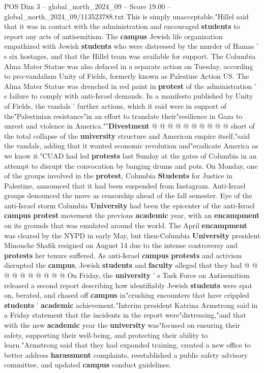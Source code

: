 \begin{textsample}{POS Dim 3 – global\_north\_2024\_09 – Score 19.00 – global\_north\_2024\_09/113523788.txt}
This is simply unacceptable."Hillel said that it was in contact with the administration and encouraged \textbf{students} to report any acts of antisemitism.
The \textbf{campus} Jewish life organization empathized with Jewish \textbf{students} who were distressed by the murder of Hamas ' s six hostages, and that the Hillel team was available for support.
The Columbia Alma Mater Statue was also defaced in a separate action on Tuesday, according to pro-vandalism Unity of Fields, formerly known as Palestine Action US.
The Alma Mater Statue was drenched in red paint in \textbf{protest} of the administration ' s failure to comply with anti-Israel demands.
In a manifesto published by Unity of Fields, the vandals ' further actions, which it said were in support of the"Palestinian resistance"in an effort to translate their"resilience in Gaza to unrest and violence in America.""\textbf{Divestment} @ @ @ @ @ @ @ @ @ @ short of the total collapse of the \textbf{university} structure and American empire itself,"said the vandals, adding that it wanted economic revolution and"eradicate America as we know it."CUAD had led \textbf{protests} last Sunday at the gates of Columbia in an attempt to disrupt the convocation by banging drums and pots.
On Monday, one of the groups involved in the \textbf{protest}, Columbia \textbf{Students} for Justice in Palestine, announced that it had been suspended from Instagram.
Anti-Israel groups denounced the move as censorship ahead of the fall semester.
Eye of the anti-Israel storm Columbia \textbf{University} had been the epicenter of the anti-Israel \textbf{campus} \textbf{protest} movement the previous \textbf{academic} year, with an \textbf{encampment} on its grounds that was emulated around the world.
The April \textbf{encampment} was cleared by the NYPD in early May, but then-Columbia \textbf{University} president Minouche Shafik resigned on August 14 due to the intense controversy and \textbf{protests} her tenure suffered.
As anti-Israel \textbf{campus} \textbf{protests} and activism disrupted the \textbf{campus}, Jewish \textbf{students} and \textbf{faculty} alleged that they had @ @ @ @ @ @ @ @ @ @ On Friday, the \textbf{university} ' s Task Force on Antisemitism released a second report describing how identifiably Jewish \textbf{students} were spat on, berated, and chased off \textbf{campus} in"crushing encounters that have crippled \textbf{students} ' \textbf{academic} achievement."Interim president Katrina Armstrong said in a Friday statement that the incidents in the report were"distressing,"and that with the new \textbf{academic} year the \textbf{university} was"focused on ensuring their safety, supporting their well-being, and protecting their ability to learn."Armstrong said that they had expanded training, created a new office to better address \textbf{harassment} complaints, reestablished a public safety advisory committee, and updated \textbf{campus} conduct guidelines.

\end{textsample}
